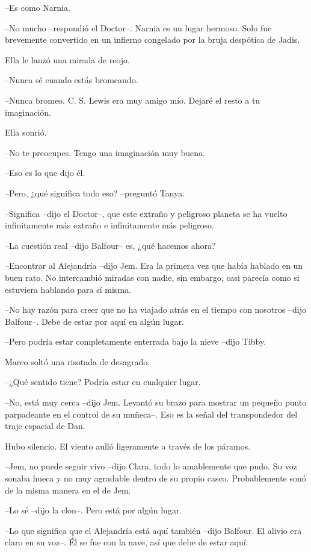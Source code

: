{--Es como Narnia.}

{--No mucho --respondió el Doctor--. Narnia es un lugar hermoso. Solo fue
 brevemente convertido en un infierno congelado por la bruja despótica de
Jadis.}

{Ella le lanzó una mirada de reojo.}

{--Nunca sé cuando estás bromeando.}

{--Nunca bromeo. C. S. Lewis era muy amigo mío. Dejaré el resto a tu
imaginación.}

{Ella sonrió.}

{--No te preocupes. Tengo una imaginación muy buena.}

{--Eso es lo que dijo él.}

{--Pero, ¿qué significa todo eso? --preguntó Tanya.}

{--Significa --dijo el Doctor--, que este extraño y peligroso planeta se
ha vuelto infinitamente más extraño e infinitamente más peligroso.}

{--La cuestión real --dijo Balfour-- es, ¿qué hacemos ahora?}

{--Encontrar al Alejandría --dijo Jem. Era la primera vez que había
 hablado en un buen rato. No intercambió miradas con nadie, sin embargo,
casi parecía como si estuviera hablando para sí misma.}

{--No hay razón para creer que no ha viajado atrás en el tiempo con
nosotros --dijo Balfour--. Debe de estar por aquí en algún lugar.}

{--Pero podría estar completamente enterrada bajo la nieve --dijo
Tibby.}

{Marco soltó una risotada de desagrado.}

{--¿Qué sentido tiene? Podría estar en cualquier lugar.}

{--No, está muy cerca --dijo Jem. Levantó su brazo para mostrar un
 pequeño punto parpadeante en el control de su muñeca--. Eso es la señal
del transpondedor del traje espacial de Dan.}

{Hubo silencio. El viento aulló ligeramente a través de los páramos.}

{--Jem, no puede seguir vivo --dijo Clara, todo lo amablemente que pudo.
 Su voz sonaba hueca y no muy agradable dentro de su propio casco.
Probablemente sonó de la misma manera en el de Jem.}

{--Lo sé --dijo la clon--. Pero está por algún lugar.}

{--Lo que significa que el Alejandría está aquí también --dijo Balfour.
 El alivio era claro en su voz--. Él se fue con la nave, así que debe de
estar aquí.}

